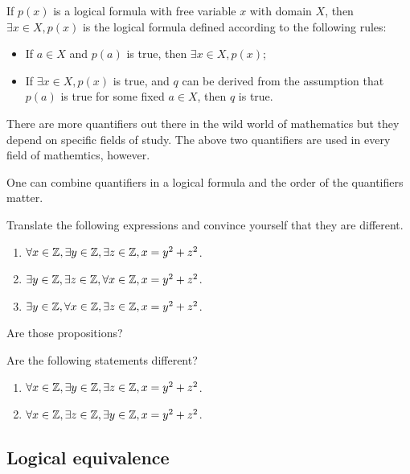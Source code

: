 \begin{definition}
    If $p(x)$ is a logical formula with free variable $x$ with domain $X$, then 
    $\exists x\in X, p(x)$ is the logical formula defined according to the following rules:
    \begin{itemize}
        \item If $a\in X$ and $p(a)$ is true, then $\exists x \in X, p(x)$;
        \item If $\exists x\in X, p(x)$ is true, and $q$ can be derived from the assumption
            that $p(a)$ is true for some fixed $a \in X$, then $q$ is true.
    \end{itemize}
\end{definition}

There are more quantifiers out there in the wild world of mathematics but they depend
on specific fields of study. The above two quantifiers are used in every field of mathemtics, however.

One can combine quantifiers in a logical formula and the order of the quantifiers matter.
\begin{exercise}
   Translate the following expressions and convince yourself that they are different. 
   \begin{enumerate}
       \item $\forall x \in \mathbb{Z}, \exists y \in \mathbb{Z}, \exists z \in \mathbb{Z}, x = y^2 + z^2$. 
       \item $\exists y \in \mathbb{Z}, \exists z \in \mathbb{Z}, \forall x \in \mathbb{Z}, x = y^2 + z^2$. 
       \item $\exists y \in \mathbb{Z}, \forall x \in \mathbb{Z},\exists z \in \mathbb{Z},  x = y^2 + z^2$. 
   \end{enumerate}
   Are those propositions?

   Are the following statements different?
    \begin{enumerate}
       \item $\forall x \in \mathbb{Z}, \exists y \in \mathbb{Z}, \exists z \in \mathbb{Z}, x = y^2 + z^2$.
       \item $\forall x \in \mathbb{Z}, \exists z \in \mathbb{Z}, \exists y \in \mathbb{Z}, x = y^2 + z^2$. 
   \end{enumerate}
\end{exercise}


\subsection{Logical equivalence}

